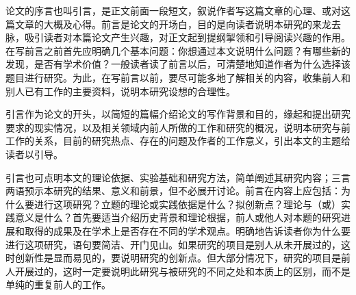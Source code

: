 
\begin{introduction}

论文的序言也叫引言，是正文前面一段短文，叙说作者写这篇文章的心理、或对这篇文章的大概及心得。前言是论文的开场白，目的是向读者说明本研究的来龙去脉，吸引读者对本篇论文产生兴趣，对正文起到提纲掣领和引导阅读兴趣的作用。在写前言之前首先应明确几个基本问题：你想通过本文说明什么问题？有哪些新的发现，是否有学术价值？一般读者读了前言以后，可清楚地知道作者为什么选择该题目进行研究。为此，在写前言以前，要尽可能多地了解相关的内容，收集前人和别人已有工作的主要资料，说明本研究设想的合理性。

引言作为论文的开头，以简短的篇幅介绍论文的写作背景和目的，缘起和提出研究要求的现实情况，以及相关领域内前人所做的工作和研究的概况，说明本研究与前工作的关系，目前的研究热点、存在的问题及作者的工作意义，引出本文的主题给读者以引导。

引言也可点明本文的理论依据、实验基础和研究方法，简单阐述其研究内容；三言两语预示本研究的结果、意义和前景，但不必展开讨论。前言在内容上应包括：为什么要进行这项研究？立题的理论或实践依据是什么？拟创新点？理论与（或）实践意义是什么？首先要适当介绍历史背景和理论根据，前人或他人对本题的研究进展和取得的成果及在学术上是否存在不同的学术观点。明确地告诉读者你为什么要进行这项研究，语句要简洁、开门见山。如果研究的项目是别人从未开展过的，这时创新性是显而易见的，要说明研究的创新点。但大部分情况下，研究的项目是前人开展过的，这时一定要说明此研究与被研究的不同之处和本质上的区别，而不是单纯的重复前人的工作。

\end{introduction}



